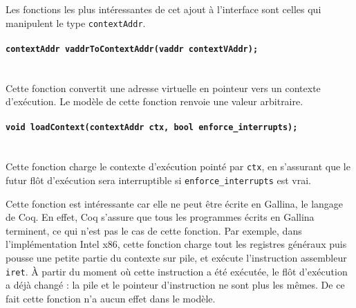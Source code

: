 %

		Les fonctions les plus intéressantes de cet ajout à l'interface sont celles qui manipulent le type \texttt{contextAddr}.

		\paragraph{\texttt{contextAddr vaddrToContextAddr(vaddr contextVAddr);}}~\\
		Cette fonction convertit une adresse virtuelle en pointeur vers un contexte d'exécution. Le modèle de cette fonction renvoie une valeur arbitraire.

		\paragraph{\texttt{void loadContext(contextAddr ctx, bool enforce_interrupts);}}~\\
		Cette fonction charge le contexte d'exécution pointé par \texttt{ctx}, en s'assurant que le futur flôt d'exécution sera interruptible si \texttt{enforce\_interrupts} est vrai.

		Cette fonction est intéressante car elle ne peut être écrite en Gallina, le langage de Coq. En effet, Coq s'assure que tous les programmes écrits en Gallina terminent, ce qui n'est pas le cas de cette fonction. Par exemple, dans l'implémentation Intel x86, cette fonction charge tout les registres généraux puis pousse une petite partie du contexte sur pile, et exécute l'instruction assembleur \texttt{iret}. À partir du moment où cette instruction a été exécutée, le flôt d'exécution a déjà changé : la pile et le pointeur d'instruction ne sont plus les mêmes. De ce fait cette fonction n'a aucun effet dans le modèle.

